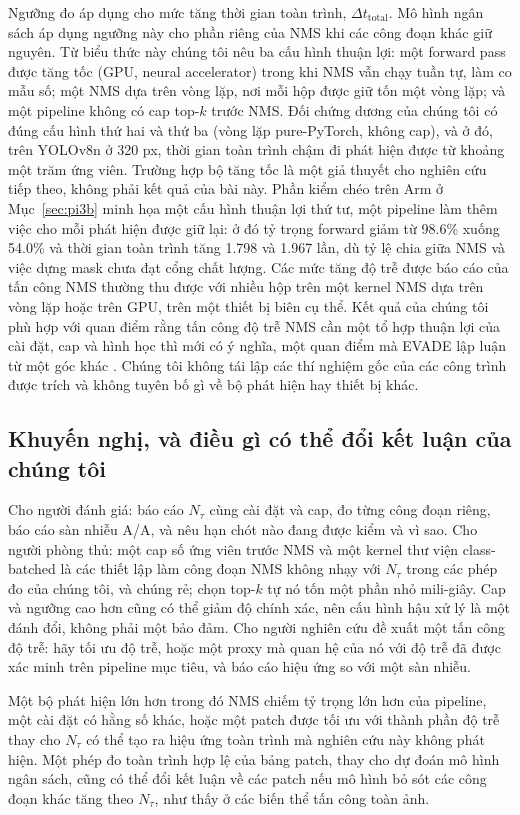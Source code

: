 \documentclass[a4paper,fleqn]{cas-dc}
\newcommand{\Ntau}{N_{\tau}}
\begin{document}
Ngưỡng đo áp dụng cho mức tăng thời gian toàn trình, $\Delta t_{\mathrm{total}}$. Mô hình ngân sách áp dụng ngưỡng này cho phần riêng của NMS khi các công đoạn khác giữ nguyên. Từ biểu thức này chúng tôi nêu ba cấu hình thuận lợi: một forward pass được tăng tốc (GPU, neural accelerator) trong khi NMS vẫn chạy tuần tự, làm co mẫu số; một NMS dựa trên vòng lặp, nơi mỗi hộp được giữ tốn một vòng lặp; và một pipeline không có cap top-$k$ trước NMS. Đối chứng dương của chúng tôi có đúng cấu hình thứ hai và thứ ba (vòng lặp pure-PyTorch, không cap), và ở đó, trên YOLOv8n ở 320 px, thời gian toàn trình chậm đi phát hiện được từ khoảng một trăm ứng viên. Trường hợp bộ tăng tốc là một giả thuyết cho nghiên cứu tiếp theo, không phải kết quả của bài này. Phần kiểm chéo trên Arm ở Mục~\ref{sec:pi3b} minh họa một cấu hình thuận lợi thứ tư, một pipeline làm thêm việc cho mỗi phát hiện được giữ lại: ở đó tỷ trọng forward giảm từ 98.6\% xuống 54.0\% và thời gian toàn trình tăng 1.798 và 1.967 lần, dù tỷ lệ chia giữa NMS và việc dựng mask chưa đạt cổng chất lượng. Các mức tăng độ trễ được báo cáo của tấn công NMS thường thu được với nhiều hộp trên một kernel NMS dựa trên vòng lặp hoặc trên GPU, trên một thiết bị biên cụ thể. Kết quả của chúng tôi phù hợp với quan điểm rằng tấn công độ trễ NMS cần một tổ hợp thuận lợi của cài đặt, cap và hình học thì mới có ý nghĩa, một quan điểm mà EVADE lập luận từ một góc khác \cite{evade2025}. Chúng tôi không tái lập các thí nghiệm gốc của các công trình được trích và không tuyên bố gì về bộ phát hiện hay thiết bị khác.

\subsection{Khuyến nghị, và điều gì có thể đổi kết luận của chúng tôi}
Cho người đánh giá: báo cáo $\Ntau$ cùng cài đặt và cap, đo từng công đoạn riêng, báo cáo sàn nhiễu A/A, và nêu hạn chót nào đang được kiểm và vì sao. Cho người phòng thủ: một cap số ứng viên trước NMS và một kernel thư viện class-batched là các thiết lập làm công đoạn NMS không nhạy với $\Ntau$ trong các phép đo của chúng tôi, và chúng rẻ; chọn top-$k$ tự nó tốn một phần nhỏ mili-giây. Cap và ngưỡng cao hơn cũng có thể giảm độ chính xác, nên cấu hình hậu xử lý là một đánh đổi, không phải một bảo đảm. Cho người nghiên cứu đề xuất một tấn công độ trễ: hãy tối ưu độ trễ, hoặc một proxy mà quan hệ của nó với độ trễ đã được xác minh trên pipeline mục tiêu, và báo cáo hiệu ứng so với một sàn nhiễu.

Một bộ phát hiện lớn hơn trong đó NMS chiếm tỷ trọng lớn hơn của pipeline, một cài đặt có hằng số khác, hoặc một patch được tối ưu với thành phần độ trễ thay cho $\Ntau$ có thể tạo ra hiệu ứng toàn trình mà nghiên cứu này không phát hiện. Một phép đo toàn trình hợp lệ của bảng patch, thay cho dự đoán mô hình ngân sách, cũng có thể đổi kết luận về các patch nếu mô hình bỏ sót các công đoạn khác tăng theo $\Ntau$, như thấy ở các biến thể tấn công toàn ảnh.
\end{document}
